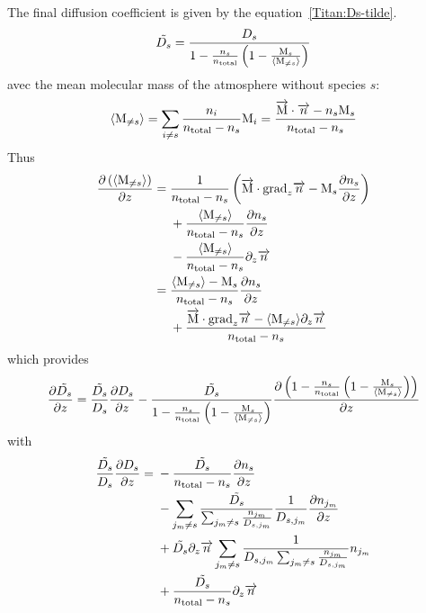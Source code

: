The final diffusion coefficient is given by the equation~\ref{Titan:Ds-tilde}.
\begin{equation}
\tilde{D_s} = \frac{D_s}{1-\frac{n_s}{n_\text{total}}\left(1 - \frac{\text{M}_s}{\langle\text{M}_{\neq s}\rangle}\right)}
\label{Titan:Ds-tilde}
\end{equation}
avec  the mean molecular mass of the atmosphere without
species $s$:
\begin{equation}
\langle\text{M}_{\neq s}\rangle   = \sum_{i\neq s} \frac{n_i}{n_\text{total} - n_s}\text{M}_i
                      = \frac{\overrightarrow{\text{M}}\cdot\overrightarrow{n} - n_s\text{M}_s}{n_\text{total} - n_s}
\end{equation}
Thus
\begin{equation}
\begin{split}
\frac{\partial\left(\langle\text{M}_{\neq s}\rangle\right)}{\partial z} = 
        &\;   \frac{1}{n_\text{total} - n_s}\left( \overrightarrow{\text{M}}\cdot\text{grad}_{z}\overrightarrow{n} - \text{M}_s\frac{\partial n_s}{\partial z}\right) \\
        &\;  + \frac{\langle\text{M}_{\neq s}\rangle}{n_\text{total} - n_s} \frac{\partial n_s}{\partial z} \\
        &\;  - \frac{\langle\text{M}_{\neq s}\rangle}{n_\text{total} - n_s} \partial_{z}{\overrightarrow{n}} \\
=       &\;    \frac{\langle\text{M}_{\neq s}\rangle - \text{M}_s}{n_\text{total} - n_s} \frac{\partial n_s}{\partial z} \\
        &\;  + \frac{\overrightarrow{\text{M}}\cdot\text{grad}_{z}\overrightarrow{n} - \langle\text{M}_{\neq s}\rangle \partial_{z}{\overrightarrow{n}}}{n_\text{total} - n_s}
\end{split}
\end{equation}
which provides
\begin{equation}
\frac{\partial\tilde{D_s}}{\partial z}  = \frac{\tilde{D_s}}{D_s}\frac{\partial D_s}{\partial z}
                             - \frac{\tilde{D_s}}{1-\frac{n_s}{n_\text{total}}\left(1 - \frac{\text{M}_s}{\langle\text{M}_{\neq s}\rangle}\right)}
                                \frac{\partial\left(1-\frac{n_s}{n_\text{total}}\left(1 - \frac{\text{M}_s}{\langle\text{M}_{\neq s}\rangle}\right)\right)}{\partial z}
\end{equation}
with
\begin{equation}
\begin{split}
\frac{\tilde{D_s}}{D_s}\frac{\partial D_s}{\partial z}
                  = &\; - \frac{\tilde{D_s}}{n_\text{total} - n_s}\frac{\partial n_s}{\partial z} \\
                    &\; - \sum_{j_m\neq s}\frac{\tilde{D_s}}{\sum_{j_m \neq s}\frac{n_{j_m}}{D_{s,j_m}}}
                                \frac{1}{D_{s,j_m}} \frac{\partial n_{j_m}}{\partial z} \\
                    &\; +  \tilde{D_s}\partial_{z}{\overrightarrow{n}} \sum_{j_m\neq s}
                           \frac{1}{D_{s,j_m}\sum_{j_m \neq s}\frac{n_{j_m}}{D_{s,j_m}}}
                                        n_{j_m} \\
                    &\; + \frac{\tilde{D_s}}{n_\text{total} - n_s}\partial_{z}{\overrightarrow{n}} \\
\end{split}
\end{equation}
